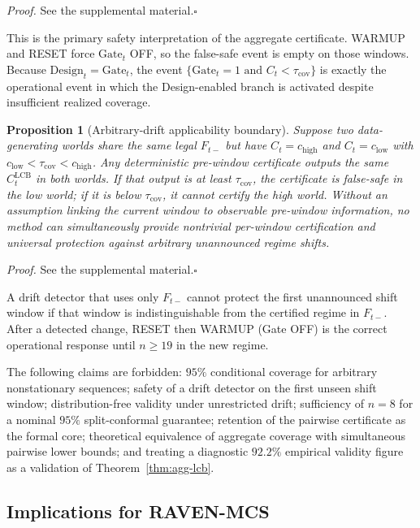 \documentclass[letterpaper,journal]{IEEEtran}
\newtheorem{proposition}{Proposition}
\begin{document}
\noindent\emph{Proof.}
See the supplemental material.\hfill$\square$

This is the primary safety interpretation of the aggregate certificate.
WARMUP and RESET force $\mathrm{Gate}_t$ OFF, so the false-safe event is empty
on those windows.
Because $\mathrm{Design}_t=\mathrm{Gate}_t$, the event
$\{\mathrm{Gate}_t=1\text{ and }C_t<\tau_{\mathrm{cov}}\}$ is exactly the
operational event in which the Design-enabled branch is activated despite
insufficient realized coverage.

\begin{proposition}[Arbitrary-drift applicability boundary]
\label{prop:drift-boundary}
Suppose two data-generating worlds share the same legal $F_{t-}$ but have
$C_t=c_{\mathrm{high}}$ and $C_t=c_{\mathrm{low}}$ with
$c_{\mathrm{low}}<\tau_{\mathrm{cov}}<c_{\mathrm{high}}$.  Any deterministic
pre-window certificate outputs the same $C^{\mathrm{LCB}}_t$ in both worlds.
If that output is at least $\tau_{\mathrm{cov}}$, the certificate is
false-safe in the low world; if it is below $\tau_{\mathrm{cov}}$, it cannot
certify the high world.  Without an assumption linking the current window to
observable pre-window information, no method can simultaneously provide
nontrivial per-window certification and universal protection against
arbitrary unannounced regime shifts.
\end{proposition}

\noindent\emph{Proof.}
See the supplemental material.\hfill$\square$

A drift detector that uses only $F_{t-}$ cannot protect the first unannounced
shift window if that window is indistinguishable from the certified regime in
$F_{t-}$.  After a detected change, RESET then WARMUP (Gate OFF) is the
correct operational response until $n\ge 19$ in the new regime.

The following claims are forbidden: $95\%$ conditional coverage for arbitrary
nonstationary sequences; safety of a drift detector on the first unseen shift
window; distribution-free validity under unrestricted drift; sufficiency of
$n=8$ for a nominal $95\%$ split-conformal guarantee; retention of the pairwise
certificate as the formal core; theoretical equivalence of aggregate coverage
with simultaneous pairwise lower bounds; and treating a diagnostic $92.2\%$
empirical validity figure as a validation of Theorem~\ref{thm:agg-lcb}.

\subsection{Implications for RAVEN-MCS}
\label{subsec:theory_implications}
\end{document}
